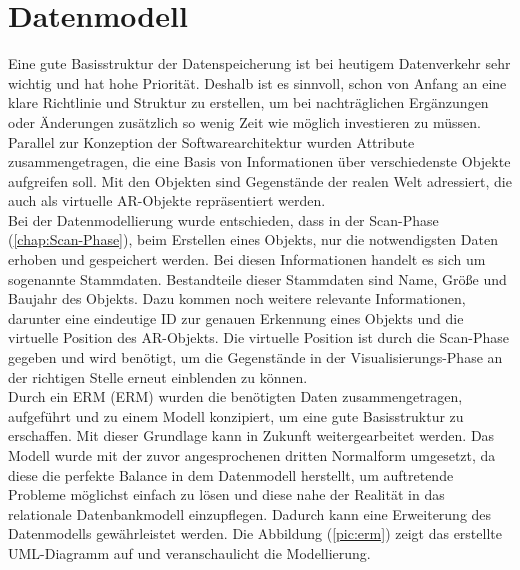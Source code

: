 \section{Datenmodell}
\label{chap:Datenmodell}
Eine gute Basisstruktur der Datenspeicherung ist bei heutigem Datenverkehr sehr wichtig und hat hohe Priorität. Deshalb ist 
es sinnvoll, schon von Anfang an eine klare Richtlinie und Struktur zu erstellen, um bei nachträglichen Ergänzungen oder Änderungen zusätzlich so wenig 
Zeit wie möglich investieren zu müssen. Parallel zur Konzeption der Softwarearchitektur wurden Attribute zusammengetragen, die 
eine Basis von Informationen über verschiedenste Objekte aufgreifen soll. Mit den Objekten sind Gegenstände der realen Welt adressiert, die auch als 
virtuelle \acs{AR}-Objekte repräsentiert werden. 
\\
Bei der Datenmodellierung wurde entschieden, dass in der Scan-Phase (\ref{chap:Scan-Phase}), beim Erstellen eines Objekts, nur die notwendigsten 
Daten erhoben und gespeichert werden. Bei diesen Informationen handelt es sich um sogenannte Stammdaten. Bestandteile dieser Stammdaten sind Name, 
Größe und Baujahr des Objekts. Dazu kommen noch weitere relevante Informationen, darunter eine eindeutige ID zur genauen Erkennung eines Objekts und 
die virtuelle Position des \acs{AR}-Objekts. Die virtuelle Position ist durch die Scan-Phase gegeben und wird benötigt, um die Gegenstände in der 
Visualisierungs-Phase an der richtigen Stelle erneut einblenden zu können. 
\\ 
\linebreak 
Durch ein \acl{ERM} (\acs{ERM}) wurden die benötigten Daten zusammengetragen, aufgeführt und zu einem Modell konzipiert, um %
eine gute Basisstruktur zu erschaffen. Mit dieser Grundlage kann in Zukunft weitergearbeitet werden. 
Das Modell wurde mit der zuvor angesprochenen dritten Normalform umgesetzt, da diese die perfekte Balance in dem Datenmodell herstellt, um auftretende 
Probleme möglichst einfach zu lösen und diese nahe der Realität in das relationale Datenbankmodell einzupflegen. Dadurch kann eine Erweiterung des 
Datenmodells gewährleistet werden. Die Abbildung (\ref{pic:erm}) zeigt das erstellte UML-Diagramm auf und veranschaulicht die Modellierung. 
\\ 
